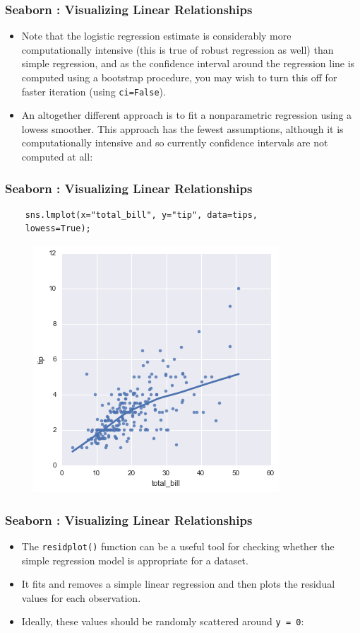 \documentclass{beamer}
\begin{document}
\begin{frame}
	\frametitle{Seaborn : Visualizing Linear Relationships}
	\large
	\begin{itemize}
		\item Note that the logistic regression estimate is considerably more computationally intensive (this is true of robust regression as well) than simple regression, and as the confidence interval around the regression line is computed using a bootstrap procedure, you may wish to turn this off for faster iteration (using \texttt{ci=False}).
		\item An altogether different approach is to fit a nonparametric regression using a lowess smoother. This approach has the fewest assumptions, although it is computationally intensive and so currently confidence intervals are not computed at all:
	\end{itemize}
	
	
\end{frame}
\begin{frame}[fragile]
	\frametitle{Seaborn : Visualizing Linear Relationships}
	\large
	
	\begin{verbatim}
	sns.lmplot(x="total_bill", y="tip", data=tips,
	lowess=True);
	\end{verbatim}
	\begin{figure}
		\centering
		\includegraphics[width=0.55\linewidth]{images/regression_33_0}
	\end{figure}
	
\end{frame}
\begin{frame}[fragile]
	\frametitle{Seaborn : Visualizing Linear Relationships}
	\large
	\begin{itemize}
		\item The \texttt{residplot()} function can be a useful tool for checking whether the simple regression model is appropriate for a dataset. 
		\item It fits and removes a simple linear regression and then plots the residual values for each observation. 
		\item Ideally, these values should be randomly scattered around \texttt{y = 0}:
	\end{itemize}	
	
	
\end{frame}
\end{document}
